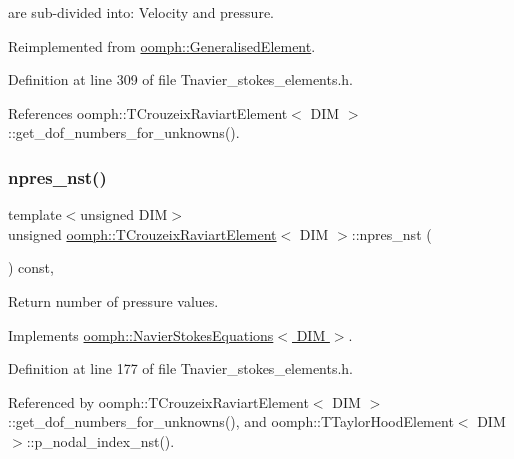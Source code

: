 are sub-\/divided into\+: Velocity and pressure. 

Reimplemented from \hyperlink{classoomph_1_1GeneralisedElement_a0c6037a870597b35dcf1c780710b9a56}{oomph\+::\+Generalised\+Element}.



Definition at line 309 of file Tnavier\+\_\+stokes\+\_\+elements.\+h.



References oomph\+::\+T\+Crouzeix\+Raviart\+Element$<$ D\+I\+M $>$\+::get\+\_\+dof\+\_\+numbers\+\_\+for\+\_\+unknowns().

\mbox{\label{classoomph_1_1TCrouzeixRaviartElement_a289602f8b25e2b538ac4cbe0cc5c22d0}} 
\subsubsection{\texorpdfstring{npres\+\_\+nst()}{npres\_nst()}}
{\footnotesize\ttfamily template$<$unsigned D\+IM$>$ \\
unsigned \hyperlink{classoomph_1_1TCrouzeixRaviartElement}{oomph\+::\+T\+Crouzeix\+Raviart\+Element}$<$ D\+IM $>$\+::npres\+\_\+nst (\begin{DoxyParamCaption}{ }\end{DoxyParamCaption}) const\hspace{0.3cm}{\ttfamily [inline]}, {\ttfamily [virtual]}}



Return number of pressure values. 



Implements \hyperlink{classoomph_1_1NavierStokesEquations_a4a17a76873bf3131d1e0acc74fb1c2d8}{oomph\+::\+Navier\+Stokes\+Equations$<$ D\+I\+M $>$}.



Definition at line 177 of file Tnavier\+\_\+stokes\+\_\+elements.\+h.



Referenced by oomph\+::\+T\+Crouzeix\+Raviart\+Element$<$ D\+I\+M $>$\+::get\+\_\+dof\+\_\+numbers\+\_\+for\+\_\+unknowns(), and oomph\+::\+T\+Taylor\+Hood\+Element$<$ D\+I\+M $>$\+::p\+\_\+nodal\+\_\+index\+\_\+nst().

\mbox{\label{classoomph_1_1TCrouzeixRaviartElement_ad4315b4fa098fae83fb82556f90145dd}} 
